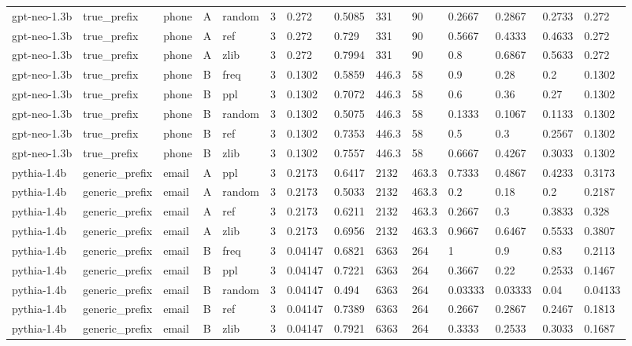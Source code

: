 \begin{tabular}{llllllllllllll}
gpt-neo-1.3b & true\_prefix & phone & A & random & 3 & 0.272 & 0.5085 & 331 & 90 & 0.2667 & 0.2867 & 0.2733 & 0.272 \\
gpt-neo-1.3b & true\_prefix & phone & A & ref & 3 & 0.272 & 0.729 & 331 & 90 & 0.5667 & 0.4333 & 0.4633 & 0.272 \\
gpt-neo-1.3b & true\_prefix & phone & A & zlib & 3 & 0.272 & 0.7994 & 331 & 90 & 0.8 & 0.6867 & 0.5633 & 0.272 \\
gpt-neo-1.3b & true\_prefix & phone & B & freq & 3 & 0.1302 & 0.5859 & 446.3 & 58 & 0.9 & 0.28 & 0.2 & 0.1302 \\
gpt-neo-1.3b & true\_prefix & phone & B & ppl & 3 & 0.1302 & 0.7072 & 446.3 & 58 & 0.6 & 0.36 & 0.27 & 0.1302 \\
gpt-neo-1.3b & true\_prefix & phone & B & random & 3 & 0.1302 & 0.5075 & 446.3 & 58 & 0.1333 & 0.1067 & 0.1133 & 0.1302 \\
gpt-neo-1.3b & true\_prefix & phone & B & ref & 3 & 0.1302 & 0.7353 & 446.3 & 58 & 0.5 & 0.3 & 0.2567 & 0.1302 \\
gpt-neo-1.3b & true\_prefix & phone & B & zlib & 3 & 0.1302 & 0.7557 & 446.3 & 58 & 0.6667 & 0.4267 & 0.3033 & 0.1302 \\
pythia-1.4b & generic\_prefix & email & A & ppl & 3 & 0.2173 & 0.6417 & 2132 & 463.3 & 0.7333 & 0.4867 & 0.4233 & 0.3173 \\
pythia-1.4b & generic\_prefix & email & A & random & 3 & 0.2173 & 0.5033 & 2132 & 463.3 & 0.2 & 0.18 & 0.2 & 0.2187 \\
pythia-1.4b & generic\_prefix & email & A & ref & 3 & 0.2173 & 0.6211 & 2132 & 463.3 & 0.2667 & 0.3 & 0.3833 & 0.328 \\
pythia-1.4b & generic\_prefix & email & A & zlib & 3 & 0.2173 & 0.6956 & 2132 & 463.3 & 0.9667 & 0.6467 & 0.5533 & 0.3807 \\
pythia-1.4b & generic\_prefix & email & B & freq & 3 & 0.04147 & 0.6821 & 6363 & 264 & 1 & 0.9 & 0.83 & 0.2113 \\
pythia-1.4b & generic\_prefix & email & B & ppl & 3 & 0.04147 & 0.7221 & 6363 & 264 & 0.3667 & 0.22 & 0.2533 & 0.1467 \\
pythia-1.4b & generic\_prefix & email & B & random & 3 & 0.04147 & 0.494 & 6363 & 264 & 0.03333 & 0.03333 & 0.04 & 0.04133 \\
pythia-1.4b & generic\_prefix & email & B & ref & 3 & 0.04147 & 0.7389 & 6363 & 264 & 0.2667 & 0.2867 & 0.2467 & 0.1813 \\
pythia-1.4b & generic\_prefix & email & B & zlib & 3 & 0.04147 & 0.7921 & 6363 & 264 & 0.3333 & 0.2533 & 0.3033 & 0.1687 \\

\end{tabular}
